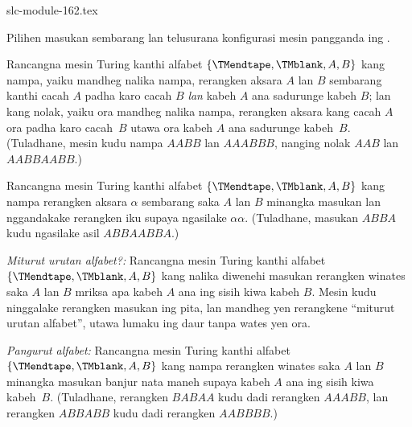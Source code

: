 \begin{filecontents*}[overwrite]{slc-module-162.tex}
\begin{prob}
Pilihen masukan sembarang lan telusurana konfigurasi
mesin pangganda ing .
\end{prob}

\begin{prob}
Rancangna mesin Turing kanthi alfabet
$\{\TMendtape,\TMblank, A, B\}$ kang nampa,
yaiku mandheg nalika nampa, rerangken aksara
$A$ lan $B$ sembarang kanthi cacah $A$
padha karo cacah $B$ \emph{lan} kabeh $A$
ana sadurunge kabeh $B$; lan kang nolak,
yaiku ora mandheg nalika nampa, rerangken
aksara kang cacah $A$ ora padha karo cacah~$B$
utawa ora kabeh $A$ ana sadurunge kabeh~$B$.
(Tuladhane, mesin kudu nampa $AABB$ lan
$AAABBB$, nanging nolak $AAB$ lan $AABBAABB$.)
\end{prob}

\begin{prob}
Rancangna mesin Turing kanthi alfabet
$\{\TMendtape,\TMblank, A, B\}$ kang nampa
rerangken aksara $\alpha$ sembarang saka $A$
lan $B$ minangka masukan lan nggandakake
rerangken iku supaya ngasilake $\alpha\alpha$.
(Tuladhane, masukan $ABBA$ kudu ngasilake
asil $ABBAABBA$.)
\end{prob}

\begin{prob}
\emph{Miturut urutan alfabet?:} Rancangna
mesin Turing kanthi alfabet
$\{\TMendtape,\TMblank, A, B\}$ kang nalika
diwenehi masukan rerangken winates saka $A$
lan $B$ mriksa apa kabeh $A$ ana ing
sisih kiwa kabeh $B$. Mesin kudu ninggalake
rerangken masukan ing pita, lan mandheg yen
rerangkene ``miturut urutan alfabet'',
utawa lumaku ing daur tanpa wates yen ora.
\end{prob}

\begin{prob}
\emph{Pangurut alfabet:} Rancangna mesin
Turing kanthi alfabet
$\{\TMendtape,\TMblank, A, B\}$ kang nampa
rerangken winates saka $A$ lan $B$ minangka
masukan banjur nata maneh supaya kabeh $A$
ana ing sisih kiwa kabeh~$B$. (Tuladhane,
rerangken $BABAA$ kudu dadi rerangken $AAABB$,
lan rerangken $ABBABB$ kudu dadi rerangken
$AABBBB$.)
\end{prob}


\end{filecontents*}

